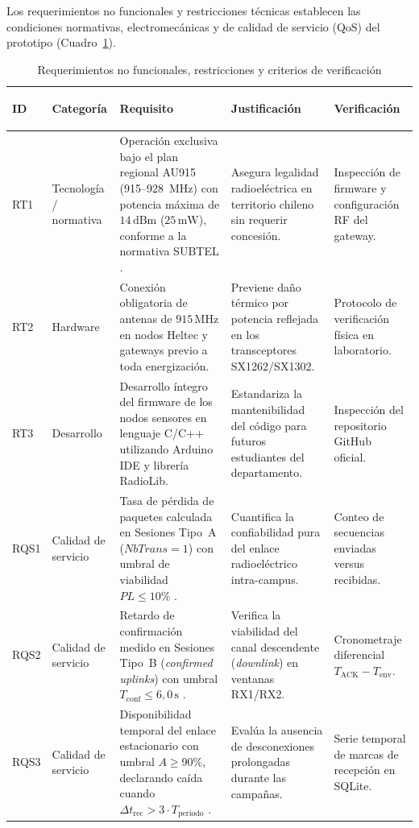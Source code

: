 \documentclass[12pt,oneside,openany,spanish,oldfontcommands]{memoir}
\renewcommand{\arraystretch}{1.15}
\begin{document}
Los requerimientos no funcionales y restricciones técnicas establecen las condiciones normativas, electromecánicas y de calidad de servicio (QoS) del prototipo (Cuadro~\ref{tab:rnf}).

\begin{table}[H]
\centering
\caption{Requerimientos no funcionales, restricciones y criterios de verificación}
\label{tab:rnf}
\scriptsize
\setlength{\tabcolsep}{3pt}
\renewcommand{\arraystretch}{0.95}
\begin{tabularx}{\textwidth}{
    >{\bfseries\raggedright\arraybackslash}p{1.1cm}
    >{\raggedright\arraybackslash}p{1.6cm}
    >{\raggedright\arraybackslash}X
    >{\raggedright\arraybackslash}p{2.4cm}
    >{\raggedright\arraybackslash}p{2.1cm}
}
\toprule
\textbf{ID} &
\textbf{Categoría} &
\textbf{Requisito} &
\textbf{Justificación} &
\textbf{Verificación}\\
\midrule
RT1 &
Tecnología / normativa &
Operación exclusiva bajo el plan regional AU915 (915--928~MHz) con potencia máxima de $14\,\text{dBm}$ ($25\,\text{mW}$), conforme a la normativa SUBTEL \parencite{subtel2017,subtel737_2025}.
&
Asegura legalidad radioeléctrica en territorio chileno sin requerir concesión.
&
Inspección de firmware y configuración RF del gateway.
\\
\midrule
RT2 &
Hardware &
Conexión obligatoria de antenas de $915\,\text{MHz}$ en nodos Heltec y gateways previo a toda energización.
&
Previene daño térmico por potencia reflejada en los transceptores SX1262/SX1302.
&
Protocolo de verificación física en laboratorio.
\\
\midrule
RT3 &
Desarrollo &
Desarrollo íntegro del firmware de los nodos sensores en lenguaje C/C++ utilizando Arduino IDE y librería RadioLib.
&
Estandariza la mantenibilidad del código para futuros estudiantes del departamento.
&
Inspección del repositorio GitHub oficial.
\\
\midrule
RQS1 &
Calidad de servicio &
Tasa de pérdida de paquetes calculada en Sesiones Tipo~A ($NbTrans = 1$) con umbral de viabilidad $PL \leq 10\%$ \parencite{kaur2024campus,ahmed2024vegetacion}.
&
Cuantifica la confiabilidad pura del enlace radioeléctrico intra-campus.
&
Conteo de secuencias enviadas versus recibidas.
\\
\midrule
RQS2 &
Calidad de servicio &
Retardo de confirmación medido en Sesiones Tipo~B (\textit{confirmed uplinks}) con umbral $T_{\mathrm{conf}} \leq 6,0\,\text{s}$ \parencite{lorawan1_0_4}.
&
Verifica la viabilidad del canal descendente (\textit{downlink}) en ventanas RX1/RX2.
&
Cronometraje diferencial $T_{\mathrm{ACK}} - T_{\mathrm{env}}$.
\\
\midrule
RQS3 &
Calidad de servicio &
Disponibilidad temporal del enlace estacionario con umbral $A \geq 90\%$, declarando caída cuando $\Delta t_{\mathrm{rec}} > 3 \cdot T_{\mathrm{periodo}}$ \parencite{barrachina2023campus}.
&
Evalúa la ausencia de desconexiones prolongadas durante las campañas.
&
Serie temporal de marcas de recepción en SQLite.
\\
\bottomrule
\end{tabularx}
\end{table}
\end{document}
